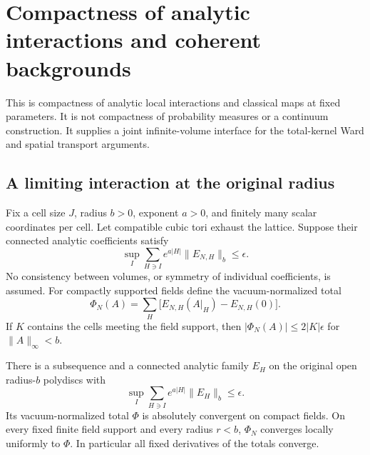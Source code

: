 \section{Compactness of analytic interactions and coherent backgrounds}
\label{aic-section}

This is compactness of analytic local interactions and classical
maps at fixed parameters. It is not compactness of probability
measures or a continuum construction. It supplies a joint
infinite-volume interface for the total-kernel Ward and spatial
transport arguments.

\subsection{A limiting interaction at the original radius}
\label{aic-interaction-section}

Fix a cell size \(J\), radius \(b>0\), exponent \(a>0\), and
finitely many scalar coordinates per cell. Let compatible cubic
tori exhaust the lattice. Suppose their connected analytic
coefficients satisfy
\begin{equation}
 \sup_I\sum_{H\ni I}e^{a|H|}\|E_{N,H}\|_b\le\epsilon .
 \label{aic-input}
\end{equation}
No consistency between volumes, or symmetry of individual
coefficients, is assumed. For compactly supported fields define
the vacuum-normalized total
\begin{equation}
 \Phi_N(A)=\sum_H\bigl[E_{N,H}(A|_H)-E_{N,H}(0)\bigr].
 \label{aic-total}
\end{equation}
If \(K\) contains the cells meeting the field support, then
\(|\Phi_N(A)|\le2|K|\epsilon\) for \(\|A\|_\infty<b\).

\begin{proposition}
\label{aic-interaction-proposition}
There is a subsequence and a connected analytic family \(E_H\)
on the original open radius-\(b\) polydiscs with
\begin{equation}
 \sup_I\sum_{H\ni I}e^{a|H|}\|E_H\|_b\le\epsilon .
 \label{aic-limit-norm}
\end{equation}
Its vacuum-normalized total \(\Phi\) is absolutely convergent on
compact fields. On every fixed finite field support and every
radius \(r<b\), \(\Phi_N\) converges locally uniformly to \(\Phi\).
In particular all fixed derivatives of the totals converge.
\end{proposition}

